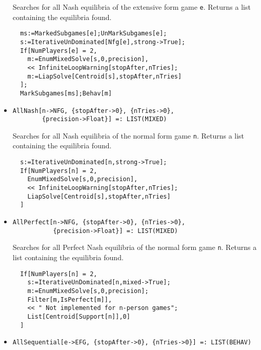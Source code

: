 \begin{itemize}
\bd 
Searches for all Nash equilibria of the extensive form game
\verb+e+.  Returns a list containing the equilibria found.

\begin{verbatim}
  ms:=MarkedSubgames[e];UnMarkSubgames[e];
  s:=IterativeUnDominated[Nfg[e],strong->True];
  If[NumPlayers[e] = 2, 
    m:=EnumMixedSolve[s,0,precision],
    << InfiniteLoopWarning[stopAfter,nTries];
    m:=LiapSolve[Centroid[s],stopAfter,nTries]
  ];
  MarkSubgames[ms];Behav[m]
\end{verbatim} 
\ed

\item{}
\protect \large \begin{verbatim}
AllNash[n->NFG, {stopAfter->0}, {nTries->0}, 
        {precision->Float}] =: LIST(MIXED) 
\end{verbatim}\normalsize

\bd 
Searches for all Nash equilibria of the normal form game
\verb+n+.  Returns a list containing the equilibria found.

\begin{verbatim}
  s:=IterativeUnDominated[n,strong->True];
  If[NumPlayers[n] = 2, 
    EnumMixedSolve[s,0,precision],
    << InfiniteLoopWarning[stopAfter,nTries];
    LiapSolve[Centroid[s],stopAfter,nTries]
  ]
\end{verbatim} 
\ed

\item{}
\protect \large \begin{verbatim}
AllPerfect[n->NFG, {stopAfter->0}, {nTries->0}, 
           {precision->Float}] =: LIST(MIXED) 
\end{verbatim}\normalsize

\bd 
Searches for all Perfect Nash equilibria of the normal form game
\verb+n+.  Returns a list containing the equilibria found.

\begin{verbatim}
  If[NumPlayers[n] = 2, 
    s:=IterativeUnDominated[n,mixed->True];
    m:=EnumMixedSolve[s,0,precision];
    Filter[m,IsPerfect[m]],
    << " Not implemented for n-person games";
    List[Centroid[Support[n]],0]
  ]
\end{verbatim} 
\ed

\item{}
\protect \large \begin{verbatim}
AllSequential[e->EFG, {stopAfter->0}, {nTries->0}] =: LIST(BEHAV) 
\end{verbatim}\normalsize


\end{itemize}
